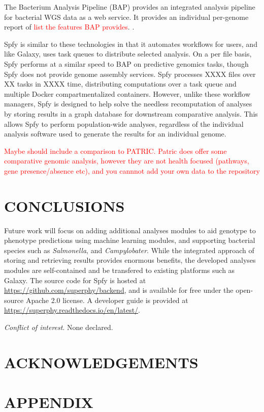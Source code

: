 \documentclass{article}
\newcommand\mwcomment[1]{\textcolor{red}{#1}}
\begin{document}
The Bacterium Analysis Pipeline (BAP) \cite{thomsen2016bacterial} provides an integrated analysis pipeline for bacterial WGS data as a web service. It provides an individual per-genome report of \mwcomment{list the features BAP provides}. \cite{thomsen2016bacterial}.

Spfy is similar to these technologies in that it automates workflows for users, and like Galaxy, uses task queues to distribute selected analysis.
On a per file basis, Spfy performs at a similar speed to BAP on predictive genomics tasks, though Spfy does not provide genome assembly services.
Spfy processes XXXX files over XX tasks in XXXX time, distributing computations over a task queue and multiple Docker compartmentalized containers.
However, unlike these workflow managers, Spfy is designed to help solve the needless recomputation of analyses by storing results in a graph database for downstream comparative analysis. This allows Spfy to perform population-wide analyses, regardless of the individual analysis software used to generate the results for an individual genome.

\mwcomment{Maybe should include a comparison to PATRIC. Patric does offer some comparative genomic analysis, however they are not health focused (pathways, gene presence/absence etc), and you cannnot add your own data to the repository}

\section{CONCLUSIONS}

Future work will focus on adding additional analyses modules to aid genotype to phenotype predictions using machine learning modules, and supporting bacterial species such as \textit{Salmonella}, and \textit{Campylobater}. While the integrated approach of storing and retrieving results provides enormous benefits, the developed analyses modules are self-contained and be transfered to existing platforms such as Galaxy. The source code for Spfy is hosted at \url{https://github.com/superphy/backend}, and is available for free under the open-source Apache 2.0 license. A developer guide is provided at \url{https://superphy.readthedocs.io/en/latest/}.

\textit{Conflict of interest}. None declared.

\section{ACKNOWLEDGEMENTS}

\newpage




\newpage

\section{APPENDIX}
\end{document}
